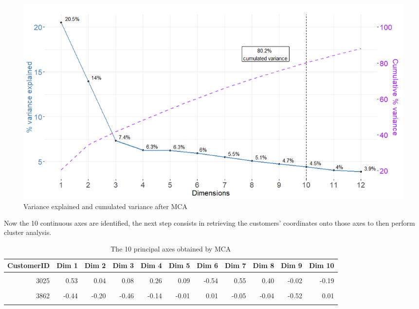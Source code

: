 \documentclass[
]{book}
\begin{document}
\begin{figure}

{\centering \includegraphics[width=15.14in]{./imgs/mca_screeplot} 

}

\caption{Variance explained and cumulated variance after MCA}\label{fig:mcascreeplot}
\end{figure}

Now the 10 continuous axes are identified, the next step consists in retrieving the customers' coordinates onto those axes to then perform cluster analysis.

\begin{table}[H]

\caption{\label{tab:unnamed-chunk-22}The 10 principal axes obtained by MCA}
\centering
\begin{tabular}[t]{rrrrrrrrrrr}
\toprule
CustomerID & Dim 1 & Dim 2 & Dim 3 & Dim 4 & Dim 5 & Dim 6 & Dim 7 & Dim 8 & Dim 9 & Dim 10\\
\midrule
\cellcolor{gray!6}{4197} & \cellcolor{gray!6}{-0.15} & \cellcolor{gray!6}{-0.02} & \cellcolor{gray!6}{-0.30} & \cellcolor{gray!6}{-0.03} & \cellcolor{gray!6}{0.03} & \cellcolor{gray!6}{-0.29} & \cellcolor{gray!6}{-0.61} & \cellcolor{gray!6}{0.01} & \cellcolor{gray!6}{-0.04} & \cellcolor{gray!6}{0.10}\\
3025 & 0.53 & 0.04 & 0.08 & 0.26 & 0.09 & -0.54 & 0.55 & 0.40 & -0.02 & -0.19\\
\cellcolor{gray!6}{6585} & \cellcolor{gray!6}{-0.04} & \cellcolor{gray!6}{-0.24} & \cellcolor{gray!6}{-0.15} & \cellcolor{gray!6}{0.40} & \cellcolor{gray!6}{0.07} & \cellcolor{gray!6}{-0.20} & \cellcolor{gray!6}{0.18} & \cellcolor{gray!6}{-0.25} & \cellcolor{gray!6}{0.02} & \cellcolor{gray!6}{0.07}\\
3862 & -0.44 & -0.20 & -0.46 & -0.14 & -0.01 & 0.01 & -0.05 & -0.04 & -0.52 & 0.01\\
\cellcolor{gray!6}{300} & \cellcolor{gray!6}{0.21} & \cellcolor{gray!6}{-0.37} & \cellcolor{gray!6}{0.11} & \cellcolor{gray!6}{0.00} & \cellcolor{gray!6}{0.00} & \cellcolor{gray!6}{-0.41} & \cellcolor{gray!6}{-0.54} & \cellcolor{gray!6}{-0.13} & \cellcolor{gray!6}{0.36} & \cellcolor{gray!6}{0.06}\\
\bottomrule
\end{tabular}
\end{table}
\end{document}
